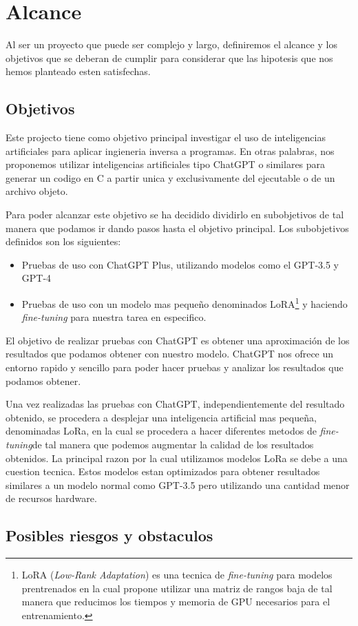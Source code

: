 \chapter{Alcance}
\label{cap:alcance}

Al ser un proyecto que puede ser complejo y largo, definiremos el alcance y los objetivos que se deberan de cumplir para considerar que las hipotesis que nos
hemos planteado esten satisfechas. 

\section{Objetivos}
\label{sec:objetivos}

Este projecto tiene como objetivo principal investigar el uso de inteligencias artificiales para aplicar ingieneria inversa a programas. 
En otras palabras, nos proponemos utilizar inteligencias artificiales tipo ChatGPT o similares para generar un codigo en C a partir unica
y exclusivamente del ejecutable o de un archivo objeto.

Para poder alcanzar este objetivo se ha decidido dividirlo en subobjetivos de tal manera que podamos ir dando pasos hasta el objetivo principal.
Los subobjetivos definidos son los siguientes:

\begin{itemize}
    \item Pruebas de uso con ChatGPT Plus, utilizando modelos como el GPT-3.5 y GPT-4
    \item Pruebas de uso con un modelo mas pequeño denominados LoRA\footnote{LoRA (\textit{Low-Rank Adaptation}) es una tecnica de \textit{fine-tuning} para modelos
          prentrenados en la cual propone utilizar una matriz de rangos baja de tal manera que reducimos los tiempos y memoria de GPU necesarios para el entrenamiento.} 
          y haciendo \textit{fine-tuning} para nuestra tarea en especifico.
\end{itemize}

El objetivo de realizar pruebas con ChatGPT es obtener una aproximación de los resultados que podamos obtener con nuestro modelo. ChatGPT nos
ofrece un entorno rapido y sencillo para poder hacer pruebas y analizar los resultados que podamos obtener.

Una vez realizadas las pruebas con ChatGPT, independientemente del resultado obtenido, se procedera a desplejar una inteligencia artificial mas pequeña,
denominadas LoRa, en la cual se procedera a hacer diferentes metodos de \textit{fine-tuning}de tal manera que podemos augmentar la calidad de los resultados
obtenidos. La principal razon por la cual utilizamos modelos LoRa se debe a una cuestion tecnica. Estos modelos estan optimizados para obtener resultados
similares a un modelo normal como GPT-3.5 pero utilizando una cantidad menor de recursos hardware.

\section{Posibles riesgos y obstaculos}
\label{sec:riesgos}